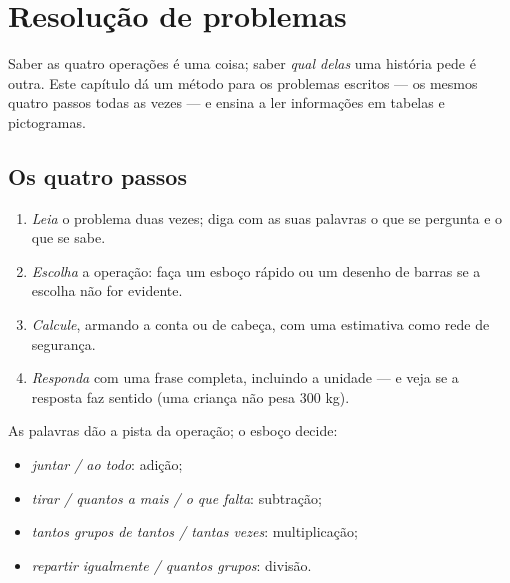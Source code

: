 \chapter{Resolução de problemas}\label{ch:g3:problems}

Saber as quatro operações é uma coisa; saber \emph{qual delas} uma
história pede é outra. Este capítulo dá um método para os problemas
escritos --- os mesmos quatro passos todas as vezes --- e ensina a
ler informações em tabelas e pictogramas.

\section{Os quatro passos}

\begin{method}\label{met:g3:problems:steps}
\begin{enumerate}
  \item \emph{Leia} o problema duas vezes; diga com as suas palavras
        o que se pergunta e o que se sabe.
  \item \emph{Escolha} a operação: faça um esboço rápido ou um
        desenho de barras se a escolha não for evidente.
  \item \emph{Calcule}, armando a conta ou de cabeça, com uma
        estimativa como rede de segurança.
  \item \emph{Responda} com uma frase completa, incluindo a unidade
        --- e veja se a resposta faz sentido (uma criança não pesa
        $300$ kg).
\end{enumerate}
\end{method}

\begin{example}\label{ex:g3:problems:which}
As palavras dão a pista da operação; o esboço decide:
\begin{itemize}
  \item \emph{juntar / ao todo}: adição;
  \item \emph{tirar / quantos a mais / o que falta}: subtração;
  \item \emph{tantos grupos de tantos / tantas vezes}:
        multiplicação;
  \item \emph{repartir igualmente / quantos grupos}: divisão.
\end{itemize}
\end{example}

